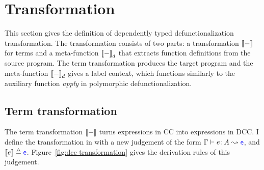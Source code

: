 


\section{Transformation}

This section gives the definition of dependently typed defunctionalization transformation.
The transformation consists of two parts: a transformation ${[\![ - ]\!]}$ for terms and a meta-function ${[\![ - ]\!]}_d$ that extracts function definitions from the source program. The term transformation produces the target program and the meta-function ${[\![ - ]\!]}_d$ gives a label context, which functions similarly to the auxiliary function \textit{apply} in polymorphic defunctionalization.

\subsection{Term transformation}

The term transformation ${[\![ - ]\!]}$ turns expressions in CC into expressions in DCC. I define the transformation in with a new judgement of the form $\Gamma \vdash e \goodcolon A \leadsto \target{e}$, and $\bbracket{e} \triangleq \target{e}$. Figure~\ref{fig:dcc transformation} gives the derivation rules of this judgement.

